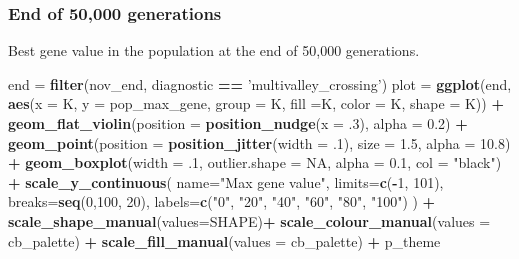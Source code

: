 \documentclass[]{book}
\newenvironment{Shaded}{\begin{snugshade}}{\end{snugshade}}
\newcommand{\DataTypeTok}[1]{\textcolor[rgb]{0.13,0.29,0.53}{#1}}
\newcommand{\DecValTok}[1]{\textcolor[rgb]{0.00,0.00,0.81}{#1}}
\newcommand{\FloatTok}[1]{\textcolor[rgb]{0.00,0.00,0.81}{#1}}
\newcommand{\KeywordTok}[1]{\textcolor[rgb]{0.13,0.29,0.53}{\textbf{#1}}}
\newcommand{\NormalTok}[1]{#1}
\newcommand{\OperatorTok}[1]{\textcolor[rgb]{0.81,0.36,0.00}{\textbf{#1}}}
\newcommand{\OtherTok}[1]{\textcolor[rgb]{0.56,0.35,0.01}{#1}}
\newcommand{\StringTok}[1]{\textcolor[rgb]{0.31,0.60,0.02}{#1}}
\begin{document}
\hypertarget{end-of-50000-generations-43}{%
\subsubsection{End of 50,000 generations}\label{end-of-50000-generations-43}}

Best gene value in the population at the end of 50,000 generations.

\begin{Shaded}
\begin{Highlighting}[]
\NormalTok{end =}\StringTok{ }\KeywordTok{filter}\NormalTok{(nov_end, diagnostic }\OperatorTok{==}\StringTok{ 'multivalley_crossing'}\NormalTok{)}
\NormalTok{plot =}\StringTok{ }\KeywordTok{ggplot}\NormalTok{(end, }\KeywordTok{aes}\NormalTok{(}\DataTypeTok{x =}\NormalTok{ K, }\DataTypeTok{y =}\NormalTok{ pop_max_gene, }\DataTypeTok{group =}\NormalTok{ K, }\DataTypeTok{fill =}\NormalTok{K, }\DataTypeTok{color =}\NormalTok{ K, }\DataTypeTok{shape =}\NormalTok{ K)) }\OperatorTok{+}
\StringTok{  }\KeywordTok{geom_flat_violin}\NormalTok{(}\DataTypeTok{position =} \KeywordTok{position_nudge}\NormalTok{(}\DataTypeTok{x =} \FloatTok{.3}\NormalTok{), }\DataTypeTok{alpha =} \FloatTok{0.2}\NormalTok{) }\OperatorTok{+}
\StringTok{  }\KeywordTok{geom_point}\NormalTok{(}\DataTypeTok{position =} \KeywordTok{position_jitter}\NormalTok{(}\DataTypeTok{width =} \FloatTok{.1}\NormalTok{), }\DataTypeTok{size =} \FloatTok{1.5}\NormalTok{, }\DataTypeTok{alpha =} \FloatTok{10.8}\NormalTok{) }\OperatorTok{+}
\StringTok{  }\KeywordTok{geom_boxplot}\NormalTok{(}\DataTypeTok{width =} \FloatTok{.1}\NormalTok{, }\DataTypeTok{outlier.shape =} \OtherTok{NA}\NormalTok{, }\DataTypeTok{alpha =} \FloatTok{0.1}\NormalTok{, }\DataTypeTok{col =} \StringTok{"black"}\NormalTok{) }\OperatorTok{+}
\StringTok{  }\KeywordTok{scale_y_continuous}\NormalTok{(}
    \DataTypeTok{name=}\StringTok{"Max gene value"}\NormalTok{,}
    \DataTypeTok{limits=}\KeywordTok{c}\NormalTok{(}\OperatorTok{-}\DecValTok{1}\NormalTok{, }\DecValTok{101}\NormalTok{),}
    \DataTypeTok{breaks=}\KeywordTok{seq}\NormalTok{(}\DecValTok{0}\NormalTok{,}\DecValTok{100}\NormalTok{, }\DecValTok{20}\NormalTok{),}
    \DataTypeTok{labels=}\KeywordTok{c}\NormalTok{(}\StringTok{"0"}\NormalTok{, }\StringTok{"20"}\NormalTok{, }\StringTok{"40"}\NormalTok{, }\StringTok{"60"}\NormalTok{, }\StringTok{"80"}\NormalTok{, }\StringTok{"100"}\NormalTok{)}
\NormalTok{  ) }\OperatorTok{+}
\StringTok{  }\KeywordTok{scale_shape_manual}\NormalTok{(}\DataTypeTok{values=}\NormalTok{SHAPE)}\OperatorTok{+}
\StringTok{  }\KeywordTok{scale_colour_manual}\NormalTok{(}\DataTypeTok{values =}\NormalTok{ cb_palette) }\OperatorTok{+}
\StringTok{  }\KeywordTok{scale_fill_manual}\NormalTok{(}\DataTypeTok{values =}\NormalTok{ cb_palette) }\OperatorTok{+}
\StringTok{  }\NormalTok{p_theme}


\end{Highlighting}
\end{Shaded}
\end{document}
